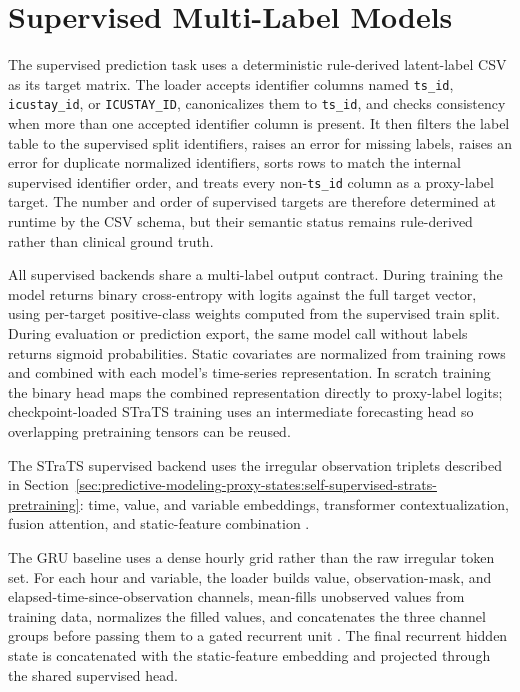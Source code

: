 \section{Supervised Multi-Label Models}
\label{sec:predictive-modeling-proxy-states:supervised-multi-label-models}

The supervised prediction task uses a deterministic rule-derived latent-label CSV as its target matrix.  The loader accepts identifier columns named \texttt{ts\_id}, \texttt{icustay\_id}, or \texttt{ICUSTAY\_ID}, canonicalizes them to \texttt{ts\_id}, and checks consistency when more than one accepted identifier column is present.  It then filters the label table to the supervised split identifiers, raises an error for missing labels, raises an error for duplicate normalized identifiers, sorts rows to match the internal supervised identifier order, and treats every non-\texttt{ts\_id} column as a proxy-label target.  The number and order of supervised targets are therefore determined at runtime by the CSV schema, but their semantic status remains rule-derived rather than clinical ground truth.

All supervised backends share a multi-label output contract.  During training the model returns binary cross-entropy with logits against the full target vector, using per-target positive-class weights computed from the supervised train split.  During evaluation or prediction export, the same model call without labels returns sigmoid probabilities.  Static covariates are normalized from training rows and combined with each model's time-series representation.  In scratch training the binary head maps the combined representation directly to proxy-label logits; checkpoint-loaded STraTS training uses an intermediate forecasting head so overlapping pretraining tensors can be reused.

The STraTS supervised backend uses the irregular observation triplets described in Section~\ref{sec:predictive-modeling-proxy-states:self-supervised-strats-pretraining}: time, value, and variable embeddings, transformer contextualization, fusion attention, and static-feature combination \cite{tipirneni2022strats}.

The GRU baseline uses a dense hourly grid rather than the raw irregular token set.  For each hour and variable, the loader builds value, observation-mask, and elapsed-time-since-observation channels, mean-fills unobserved values from training data, normalizes the filled values, and concatenates the three channel groups before passing them to a gated recurrent unit \cite{cho2014gru}.  The final recurrent hidden state is concatenated with the static-feature embedding and projected through the shared supervised head.

